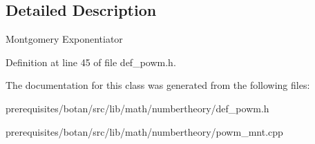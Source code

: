 \subsection{Detailed Description}
Montgomery Exponentiator 

Definition at line 45 of file def\+\_\+powm.\+h.



The documentation for this class was generated from the following files\+:\begin{DoxyCompactItemize}
\item 
prerequisites/botan/src/lib/math/numbertheory/def\+\_\+powm.\+h\item 
prerequisites/botan/src/lib/math/numbertheory/powm\+\_\+mnt.\+cpp\end{DoxyCompactItemize}
